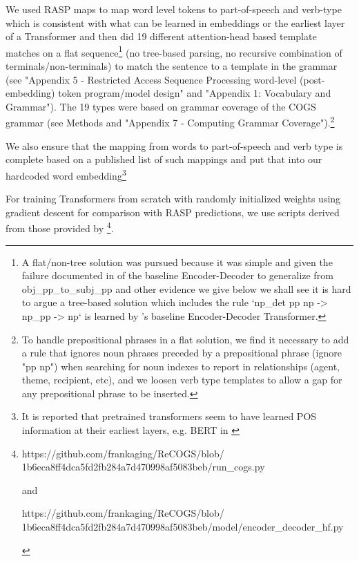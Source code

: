 \documentclass[11pt]{article}
\begin{document}
We used RASP maps to map word level tokens to part-of-speech and verb-type which is consistent with what can be learned in embeddings or the earliest layer of a Transformer \cite{tenney2019bertrediscoversclassicalnlp} and then did 19 different attention-head based template matches on a flat sequence\footnote{A flat/non-tree solution was pursued because it was simple and given the failure documented in \cite{Wu2023} of the baseline Encoder-Decoder to generalize from obj\_pp\_to\_subj\_pp and other evidence we give below we shall see it is hard to argue a tree-based solution which includes the rule `np\_det pp np -> np\_pp -> np` is learned by \cite{Wu2023}'s baseline Encoder-Decoder Transformer.} (no tree-based parsing, no recursive combination of terminals/non-terminals) to match the sentence to a template in the grammar (see "Appendix 5 - Restricted Access Sequence Processing word-level (post-embedding) token program/model design" and  "Appendix 1: Vocabulary and Grammar"). The 19 types were based on \cite{fuzzingbook2023:GrammarCoverageFuzzer} grammar coverage of the COGS grammar (see Methods and "Appendix 7 - Computing Grammar Coverage").\footnote{To handle prepositional phrases in a flat solution, we find it necessary to add a rule that ignores noun phrases preceded by a prepositional phrase (ignore "pp np") when searching for noun indexes to report in relationships (agent, theme, recipient, etc), and we loosen verb type templates to allow a gap for any prepositional phrase to be inserted.}

We also ensure that the mapping from words to part-of-speech and verb type is complete based on a published list of such mappings and put that into our hardcoded word embedding\footnote{It is reported that pretrained transformers seem to have learned POS information at their earliest layers, e.g. BERT in \cite{tenney2019bertrediscoversclassicalnlp}}

For training Transformers from scratch with randomly initialized weights using gradient descent for comparison with RASP predictions, we use scripts derived from those provided by \cite{Wu2023}\footnote{
\begin{tiny}
https://github.com/frankaging/ReCOGS/blob/
1b6eca8ff4dca5fd2fb284a7d470998af5083beb/run\_cogs.py

and

https://github.com/frankaging/ReCOGS/blob/
1b6eca8ff4dca5fd2fb284a7d470998af5083beb/model/encoder\_decoder\_hf.py 
\end{tiny}
}.
\end{document}
